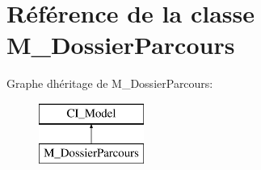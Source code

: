 \hypertarget{class_m___dossier_parcours}{}\section{Référence de la classe M\+\_\+\+Dossier\+Parcours}
\label{class_m___dossier_parcours}
Graphe d\textquotesingle{}héritage de M\+\_\+\+Dossier\+Parcours\+:\begin{figure}[H]
\begin{center}
\leavevmode
\includegraphics[height=2.000000cm]{class_m___dossier_parcours}
\end{center}
\end{figure}
